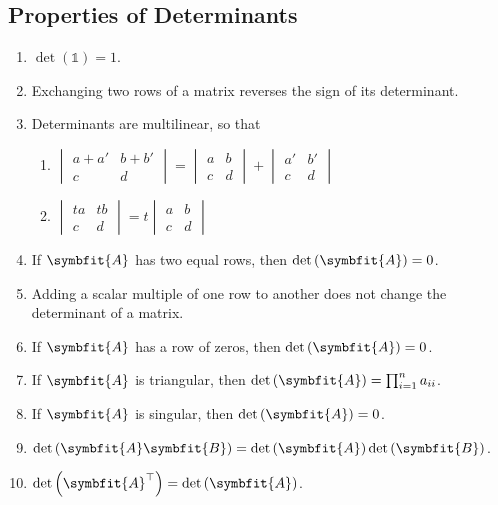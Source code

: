 \documentclass{article}
\begin{document}
\subsection{Properties of Determinants}
\begin{enumerate}
    \item \(\det{\left( \mathbb{1} \right)}=1\).
    \item Exchanging two rows of a matrix reverses the sign of its
          determinant.
    \item Determinants are multilinear, so that
          \begin{enumerate}[label=(\alph*)]
              \item \(
                    \begin{vmatrix}
                        a+a' & b+b' \\
                        c    & d
                    \end{vmatrix}
                    =
                    \begin{vmatrix}
                        a & b \\
                        c & d
                    \end{vmatrix}
                    +
                    \begin{vmatrix}
                        a' & b' \\
                        c  & d
                    \end{vmatrix}
                    \)
              \item \(
                    \begin{vmatrix}
                        ta & tb \\
                        c  & d
                    \end{vmatrix}
                    = t
                    \begin{vmatrix}
                        a & b \\
                        c & d
                    \end{vmatrix}
                    \)
          \end{enumerate}
    \item If \(\symbfit{A}\) has two equal rows, then
          \(\det{\left( \symbfit{A} \right)}=0\).
    \item Adding a scalar multiple of one row to another does not change
          the determinant of a matrix.
    \item If \(\symbfit{A}\) has a row of zeros, then
          \(\det{\left( \symbfit{A} \right)}=0\).
    \item If \(\symbfit{A}\) is triangular, then
          \(\det{\left( \symbfit{A} \right)}=\prod_{i=1}^{n} a_{ii}\).
    \item If \(\symbfit{A}\) is singular, then
          \(\det{\left( \symbfit{A} \right)}=0\).
    \item \(\det{\left( \symbfit{A}\symbfit{B} \right)}=\det{\left( \symbfit{A} \right)}\det{\left( \symbfit{B} \right)}\).
    \item \(\det{\left( \symbfit{A}^\top \right)}=\det{\left( \symbfit{A} \right)}\).
\end{enumerate}
\end{document}
